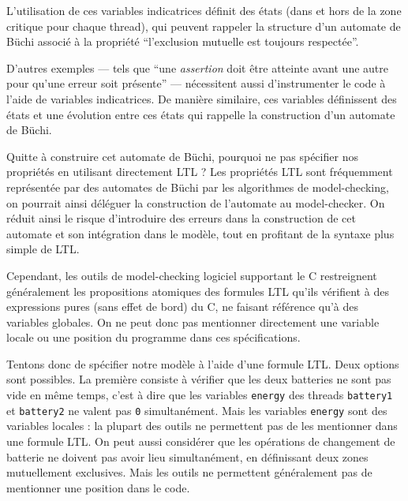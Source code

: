 
L'utilisation de ces variables indicatrices définit des états (dans et
hors de la zone critique pour chaque thread), qui peuvent rappeler la
structure d'un automate de Büchi associé à la propriété ``l'exclusion
mutuelle est toujours respectée''.

D'autres exemples --- tels que ``une \emph{assertion} doit être atteinte
avant une autre pour qu'une erreur soit présente'' --- nécessitent aussi
d'instrumenter le code à l'aide de variables indicatrices. De manière
similaire, ces variables définissent des états et une évolution entre
ces états qui rappelle la construction d'un automate de Büchi.

Quitte à construire cet automate de Büchi, pourquoi ne pas spécifier nos
propriétés en utilisant directement LTL ? Les propriétés LTL sont fréquemment
représentée par des automates de Büchi par les algorithmes de model-checking, on
pourrait ainsi déléguer la construction de l'automate au model-checker.
On réduit ainsi le risque d'introduire des erreurs dans la construction de cet
automate et son intégration dans le modèle, tout en profitant de la syntaxe plus
simple de LTL.

Cependant, les outils de model-checking logiciel supportant le C restreignent
généralement les propositions atomiques des formules LTL qu'ils vérifient à des
expressions pures (sans effet de bord) du C, ne faisant référence qu'à des
variables globales. On ne peut donc pas mentionner directement une variable
locale ou une position du programme dans ces spécifications.

Tentons donc de spécifier notre modèle à l'aide d'une formule LTL. Deux
options sont possibles. La première consiste à vérifier que les deux
batteries ne sont pas vide en même temps, c'est à dire que les variables
\texttt{energy} des threads \texttt{battery1} et
\texttt{battery2} ne valent pas \texttt{0} simultanément. Mais les
variables \texttt{energy} sont des variables locales : la
plupart des outils ne permettent pas de les mentionner dans une formule
LTL. On peut aussi considérer que les opérations de changement de
batterie ne doivent pas avoir lieu simultanément, en définissant deux
zones mutuellement exclusives. Mais les outils ne permettent
généralement pas de mentionner une position dans le code.


